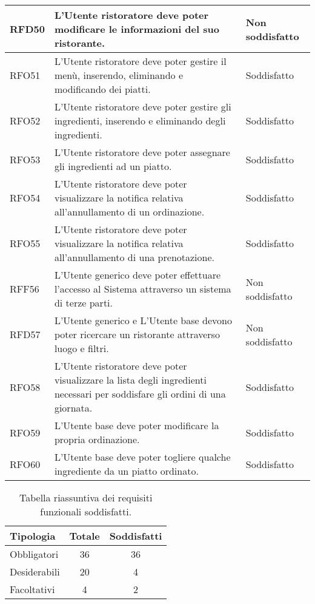 \begin{longtable}{|l|p{}|p{3cm}|}
	\hline
	RFD50       & L'Utente ristoratore deve poter modificare le informazioni del suo ristorante.                                               & Non soddisfatto \\
	\hline
	RFO51       & L'Utente ristoratore deve poter gestire il menù, inserendo, eliminando e modificando dei piatti.                             & Soddisfatto     \\
	\hline
	RFO52       & L'Utente ristoratore deve poter gestire gli ingredienti, inserendo e eliminando degli ingredienti.                           & Soddisfatto     \\
	\hline
	RFO53       & L'Utente ristoratore deve poter assegnare gli ingredienti ad un piatto.                                                      & Soddisfatto     \\
	\hline
	RFO54       & L'Utente ristoratore deve poter visualizzare la notifica relativa all'annullamento di un ordinazione.                        & Soddisfatto     \\
	\hline
	RFO55       & L'Utente ristoratore deve poter visualizzare la notifica relativa all'annullamento di una prenotazione.                      & Soddisfatto     \\
	\hline
	RFF56       & L'Utente generico deve poter effettuare l'accesso al Sistema attraverso un sistema di terze parti.                           & Non soddisfatto \\
	\hline
	RFD57       & L'Utente generico e L'Utente base devono poter ricercare un ristorante attraverso luogo e filtri.                            & Non soddisfatto \\
	\hline
	RFO58       & L'Utente ristoratore deve poter visualizzare la lista degli ingredienti necessari per soddisfare gli ordini di una giornata. & Soddisfatto     \\
	\hline
	RFO59       & L'Utente base deve poter modificare la propria ordinazione.                                                                  & Soddisfatto     \\
	\hline
	RFO60       & L'Utente base deve poter togliere qualche ingrediente da un piatto ordinato.                                                 & Soddisfatto     \\
	\hline
\end{longtable}

\begin{table}[H]
	\centering
	\begin{tabular}{l|c|c}
		\hline
		\textbf{Tipologia} & \textbf{Totale} & \textbf{Soddisfatti} \\
		\hline
		Obbligatori        & 36              & 36                   \\
		Desiderabili       & 20              & 4                    \\
		Facoltativi        & 4               & 2                    \\
		\hline
	\end{tabular}
	\caption{Tabella riassuntiva dei requisiti funzionali soddisfatti.}
\end{table}

